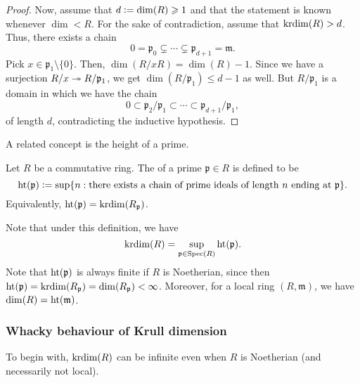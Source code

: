 \documentclass[12pt]{article}
\begin{document}
\begin{proof}
	Now, assume that $d \vcentcolon= \dim(R) \ge 1$ and that the statement is known whenever $\dim < R$. \newline
	For the sake of contradiction, assume that $\krdim(R) > d$. Thus, there exists a chain
	\begin{equation*} 
		0 = \mathfrak{p}_{0} \subsetneq \cdots \subsetneq \mathfrak{p}_{d + 1} = \mathfrak{m}.
	\end{equation*}
	Pick $x \in \mathfrak{p}_{1} \setminus \{0\}$. Then, $\dim(R/xR) = \dim(R) - 1$. Since we have a surjection $R/x \onto R/\mathfrak{p}_{1}$, we get $\dim(R/\mathfrak{p}_{1}) \le d - 1$ as well. \newline
	But $R/\mathfrak{p}_{1}$ is a domain in which we have the chain
	\begin{equation*} 
		0 \subset \mathfrak{p}_{2}/\mathfrak{p}_{1} \subset \cdots \subset \mathfrak{p}_{d + 1}/\mathfrak{p}_{1},
	\end{equation*}
	of length $d$, contradicting the inductive hypothesis.
\end{proof}

A related concept is the height of a prime.

\begin{defn}
	Let $R$ be a commutative ring. The  of a prime $\mathfrak{p} \in R$ is defined to be 
	\begin{equation*} 
		\htt(\mathfrak{p}) \vcentcolon= \sup\{n : \text{there exists a chain of prime ideals of length $n$ ending at $\mathfrak{p}$}\}.
	\end{equation*}
	Equivalently, $\htt(\mathfrak{p}) = \krdim(R_{\mathfrak{p}})$.
\end{defn}

Note that under this definition, we have
\begin{equation*} 
	\krdim(R) = \sup_{\mathfrak{p} \in \Spec(R)} \htt(\mathfrak{p}).
\end{equation*}
Note that $\htt(\mathfrak{p})$ is always finite if $R$ is Noetherian, since then $\htt(\mathfrak{p}) = \krdim(R_{\mathfrak{p}}) = \dim(R_{\mathfrak{p}}) < \infty$. \newline
Moreover, for a local ring $(R, \mathfrak{m})$, we have $\dim(R) = \htt(\mathfrak{m})$.

\subsubsection{Whacky behaviour of Krull dimension}

To begin with, $\krdim(R)$ can be infinite even when $R$ is Noetherian (and necessarily not local). 
\end{document}

